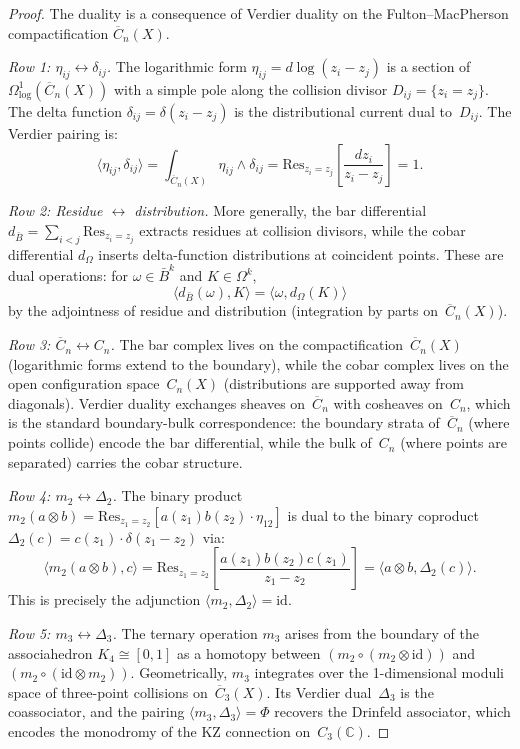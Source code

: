 \begin{proof}
The duality is a consequence of Verdier duality on the Fulton--MacPherson compactification $\overline{C}_n(X)$.

\emph{Row 1: $\eta_{ij} \leftrightarrow \delta_{ij}$.}
The logarithmic form $\eta_{ij} = d\log(z_i - z_j)$ is a section of $\Omega^1_{\log}(\overline{C}_n(X))$ with a simple pole along the collision divisor $D_{ij} = \{z_i = z_j\}$.  The delta function $\delta_{ij} = \delta(z_i - z_j)$ is the distributional current dual to~$D_{ij}$.  The Verdier pairing is:
\[
\langle \eta_{ij}, \delta_{ij} \rangle = \int_{\overline{C}_n(X)} \eta_{ij} \wedge \delta_{ij} = \mathrm{Res}_{z_i = z_j}\!\left[\frac{dz_i}{z_i - z_j}\right] = 1.
\]

\emph{Row 2: Residue $\leftrightarrow$ distribution.}
More generally, the bar differential $d_{\bar{B}} = \sum_{i<j} \mathrm{Res}_{z_i = z_j}$ extracts residues at collision divisors, while the cobar differential $d_\Omega$ inserts delta-function distributions at coincident points.  These are dual operations: for $\omega \in \bar{B}^k$ and $K \in \Omega^k$,
\[
\langle d_{\bar{B}}(\omega), K \rangle = \langle \omega, d_\Omega(K) \rangle
\]
by the adjointness of residue and distribution (integration by parts on~$\overline{C}_n(X)$).

\emph{Row 3: $\overline{C}_n \leftrightarrow C_n$.}
The bar complex lives on the compactification~$\overline{C}_n(X)$ (logarithmic forms extend to the boundary), while the cobar complex lives on the open configuration space~$C_n(X)$ (distributions are supported away from diagonals).  Verdier duality exchanges sheaves on~$\overline{C}_n$ with cosheaves on~$C_n$, which is the standard boundary-bulk correspondence: the boundary strata of~$\overline{C}_n$ (where points collide) encode the bar differential, while the bulk of~$C_n$ (where points are separated) carries the cobar structure.

\emph{Row 4: $m_2 \leftrightarrow \Delta_2$.}
The binary product $m_2(a \otimes b) = \mathrm{Res}_{z_1=z_2}[a(z_1) b(z_2) \cdot \eta_{12}]$ is dual to the binary coproduct $\Delta_2(c) = c(z_1) \cdot \delta(z_1 - z_2)$ via:
\[
\langle m_2(a \otimes b), c \rangle = \mathrm{Res}_{z_1=z_2}\!\left[\frac{a(z_1) b(z_2) c(z_1)}{z_1 - z_2}\right] = \langle a \otimes b, \Delta_2(c) \rangle.
\]
This is precisely the adjunction $\langle m_2, \Delta_2 \rangle = \mathrm{id}$.

\emph{Row 5: $m_3 \leftrightarrow \Delta_3$.}
The ternary operation $m_3$ arises from the boundary of the associahedron $K_4 \cong [0,1]$ as a homotopy between $(m_2 \circ (m_2 \otimes \mathrm{id}))$ and $(m_2 \circ (\mathrm{id} \otimes m_2))$.  Geometrically, $m_3$ integrates over the 1-dimensional moduli space of three-point collisions on~$\overline{C}_3(X)$.  Its Verdier dual~$\Delta_3$ is the coassociator, and the pairing $\langle m_3, \Delta_3 \rangle = \Phi$ recovers the Drinfeld associator, which encodes the monodromy of the KZ connection on~$C_3(\mathbb{C})$.
\end{proof}


